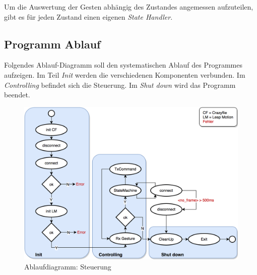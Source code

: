 Um die Auswertung der Gesten abhängig des Zustandes angemessen aufzuteilen, gibt es für jeden Zustand einen eigenen \textit{State Handler}.

\newpage
\subsection{Programm Ablauf}
Folgendes Ablauf-Diagramm soll den systematischen Ablauf des Programmes aufzeigen.
Im Teil \textit{Init} werden die verschiedenen Komponenten verbunden.
Im \textit{Controlling} befindet sich die Steuerung.
Im \textit{Shut down} wird das Programm beendet.

\vspace{7mm}
\begin{figure}[H]
	\centering
	\includegraphics[width=1.0\textwidth]{figures/poc/flowchart_controll.png}
	\vspace{0.7\baselineskip}
	\caption{Ablaufdiagramm: Steuerung}
\end{figure}


\newpage
